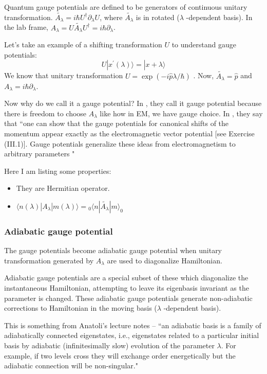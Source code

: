 \documentclass[11pt,a4paper]{article}
\begin{document}
Quantum gauge potentials are defined to be generators of continuous unitary transformation. 
$\tilde{A_{\lambda}}= i \hbar U^{\dagger} \partial_{\lambda} U$, where $\tilde{A_{\lambda}}$ is in rotated ($\lambda$ -dependent basis). In the lab frame, $A_{\lambda}= U \tilde{A_{\lambda}} U^{\dagger}=  i \hbar \partial_{\lambda}$.



Let's take an example of a shifting transformation $U$ to understand gauge potentials:
\begin{equation}
U |x^{\prime} (\lambda) \rangle =|x + \lambda \rangle
\end{equation}
We know that unitary transformation $U= \exp( - i \hat{p} \lambda/ \hbar)$ . Now, $\tilde{A_{\lambda}} =\hat{p}$ and $A_{\lambda}= i \hbar \partial_{\lambda}$. 


Now why do we call it a gauge potential? In \cite{kolodrubetz2016geometry}, they call it gauge potential because there is freedom to choose $ A_{\lambda}$ like how in EM, we have gauge choice. In \cite{kolodrubetz2016geometry}, they say that
``one can show that the gauge potentials for canonical shifts of the momentum appear exactly as the electromagnetic vector potential [see Exercise (III.1)]. Gauge potentials generalize these ideas from electromagnetism to arbitrary parameters "

 Here I am listing some properties:
\begin{itemize}
\item They are Hermitian operator.\
\item $\langle n (\lambda)| A_{\lambda}| m(\lambda) \rangle = {}_0\langle  n| \tilde{A_{\lambda}}| m \rangle_0$
\end{itemize}
 

\subsubsection*{Adiabatic gauge potential}
The gauge potentials become adiabatic gauge potential when unitary transformation generated by $A_{\lambda}$ are used to diagonalize Hamiltonian.

 Adiabatic gauge potentials are a special subset of these which diagonalize  the instantaneous Hamiltonian, attempting to leave its eigenbasis invariant as the parameter is changed. These adiabatic gauge potentials generate non-adiabatic corrections to Hamiltonian in the moving basis ($\lambda$ -dependent basis).
 
 This is something from Anatoli's lecture notes \cite{kolodrubetz2016geometry}--
``an adiabatic basis is a family of adiabatically connected eigenstates, i.e., eigenstates related
to a particular initial basis by adiabatic (infinitesimally slow) evolution of the parameter $\lambda$. For example, if two levels cross they will exchange order energetically but the adiabatic connection will be non-singular."
\end{document}

